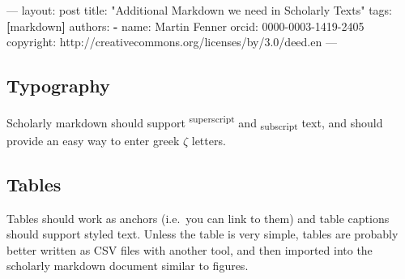 \documentclass[]{article}
\newenvironment{Shaded}{}{}
\newcommand{\KeywordTok}[1]{\textcolor[rgb]{0.00,0.44,0.13}{\textbf{{#1}}}}
\newcommand{\StringTok}[1]{\textcolor[rgb]{0.25,0.44,0.63}{{#1}}}
\newcommand{\OtherTok}[1]{\textcolor[rgb]{0.00,0.44,0.13}{{#1}}}
\newcommand{\FunctionTok}[1]{\textcolor[rgb]{0.02,0.16,0.49}{{#1}}}
\newcommand{\NormalTok}[1]{{#1}}
\begin{document}
\begin{Shaded}
\begin{Highlighting}[]
\OtherTok{---}
\FunctionTok{layout:} \NormalTok{post}
\FunctionTok{title:} \StringTok{"Additional Markdown we need in Scholarly Texts"}
\FunctionTok{tags:} \KeywordTok{[}\NormalTok{markdown}\KeywordTok{]}
\FunctionTok{authors:}
 \KeywordTok{-} \FunctionTok{name:} \NormalTok{Martin Fenner}
   \FunctionTok{orcid:} \NormalTok{0000-0003-1419-2405}
\FunctionTok{copyright:} \NormalTok{http://creativecommons.org/licenses/by/3.0/deed.en}
\OtherTok{---}
\end{Highlighting}
\end{Shaded}

\subsection{Typography}\label{typography}

Scholarly markdown should support \textsuperscript{superscript} and
\textsubscript{subscript} text, and should provide an easy way to enter
greek $\zeta$ letters.

\subsection{Tables}\label{tables}

Tables should work as anchors (i.e.~you can link to them) and table
captions should support styled text. Unless the table is very simple,
tables are probably better written as CSV files with another tool, and
then imported into the scholarly markdown document similar to figures.
\end{document}
